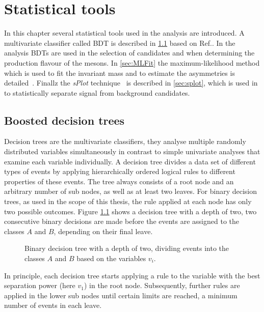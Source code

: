 \chapter{Statistical tools}
\label{chap:tools}

\linespread{1.08}\selectfont
In this chapter several statistical tools used in the analysis are introduced.
A multivariate classifier called \ac{BDT} is described in \cref{sec:BDT} based on Ref.\cite{Bohm:389738}. In the analysis \ac{BDT}s are used in the selection of \BdToDpi candidates and when determining the production flavour of the \Bz mesons.
In \cref{sec:MLFit} the maximum-likelihood method which is used to fit the invariant \Bz mass and to estimate the \CP asymmetries is detailed~\cite{Bohm:389738}.
Finallz the \emph{sPlot} technique~\cite{Pivk:2004ty} is described in \cref{sec:splot}, which is used in to statistically separate signal from background candidates.

\section{Boosted decision trees}
\label{sec:BDT}

Decision trees are the multivariate classifiers, \ie they analyse multiple randomly distributed variables simultaneously in contrast to simple univariate analyses that examine each variable individually.
A decision tree divides a data set of different types of events by applying hierarchically ordered logical rules to different properties of these events.
The tree always consists of a root node and an arbitrary number of sub nodes, as well as at least two leaves.
For binary decision trees, as used in the scope of this thesis, the rule applied at each node has only two possible outcomes.
Figure \ref{fig:BDTexample} shows a decision tree with a depth of two, \ie two consecutive binary decisions are made before the events are assigned to the classes $A$ and $B$, depending on their final leave.
\begin{figure}[tbp]
    \centering
    
    \caption{Binary decision tree with a depth of two, dividing events into the classes $A$ and $B$ based on the variables $v_i$.}
    \label{fig:BDTexample}
\end{figure}
In principle, each decision tree starts applying a rule to the variable with the best separation power (here $v_1$) in the root node.
Subsequently, further rules are applied in the lower sub nodes until certain limits are reached, \eg a minimum number of events in each leave.

